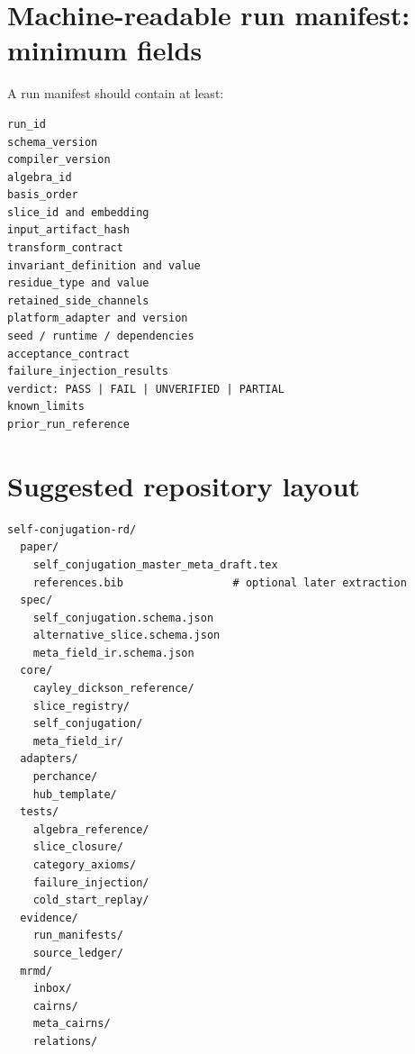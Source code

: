 \documentclass[11pt,oneside]{article}
\begin{document}
\appendix
\section{Machine-readable run manifest: minimum fields}
A run manifest should contain at least:
\begin{verbatim}
run_id
schema_version
compiler_version
algebra_id
basis_order
slice_id and embedding
input_artifact_hash
transform_contract
invariant_definition and value
residue_type and value
retained_side_channels
platform_adapter and version
seed / runtime / dependencies
acceptance_contract
failure_injection_results
verdict: PASS | FAIL | UNVERIFIED | PARTIAL
known_limits
prior_run_reference
\end{verbatim}

\section{Suggested repository layout}
\begin{verbatim}
self-conjugation-rd/
  paper/
    self_conjugation_master_meta_draft.tex
    references.bib                 # optional later extraction
  spec/
    self_conjugation.schema.json
    alternative_slice.schema.json
    meta_field_ir.schema.json
  core/
    cayley_dickson_reference/
    slice_registry/
    self_conjugation/
    meta_field_ir/
  adapters/
    perchance/
    hub_template/
  tests/
    algebra_reference/
    slice_closure/
    category_axioms/
    failure_injection/
    cold_start_replay/
  evidence/
    run_manifests/
    source_ledger/
  mrmd/
    inbox/
    cairns/
    meta_cairns/
    relations/
\end{verbatim}
\end{document}

